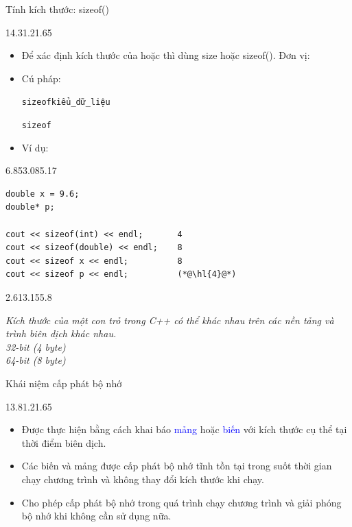 \begin{frame}[fragile]{Tính kích thước: sizeof()}
\begin{blk}{14.3}{1.2}{1.65}
\begin{itemize}[itemsep=3pt]\small
\item Để xác định kích thước của  hoặc  thì dùng size hoặc sizeof(). Đơn vị: 
\item Cú pháp:\par\vspace{2pt}
  \hspace*{5.5cm}\texttt{\textcolor{codekw}{sizeof}\bk{(}\textcolor{codenum}{kiểu\_dữ\_liệu}\bk{)}}\par\vspace{2pt}
  \hspace*{5.5cm}\texttt{\textcolor{codekw}{sizeof} }
\item Ví dụ:
\end{itemize}
\end{blk}
\begin{blk}{6.85}{3.08}{5.17}
\begin{lstlisting}[basicstyle=\cf{10.7}]
double x = 9.6;
double* p;

cout << sizeof(int) << endl;       4
cout << sizeof(double) << endl;    8
cout << sizeof x << endl;          8
cout << sizeof p << endl;          (*@\hl{4}@*)
\end{lstlisting}
\end{blk}
\begin{blk}{2.6}{13.15}{5.8}
\raggedright\fontsize{5.5}{6.6}\selectfont\itshape
Kích thước của một con trỏ trong C++ có thể khác nhau trên các nền tảng và trình biên dịch khác nhau.\\
32-bit (4 byte)\\
64-bit (8 byte)
\end{blk}
\end{frame}

\begin{frame}{Khái niệm cấp phát bộ nhớ}
\begin{blk}{13.8}{1.2}{1.65}
\begin{itemize}[itemsep=3pt]\small
\item Được thực hiện bằng cách khai báo \textcolor{blue}{mảng} hoặc \textcolor{blue}{biến} với kích thước cụ thể tại thời điểm biên dịch.
\item Các biến và mảng được cấp phát bộ nhớ tĩnh tồn tại trong suốt thời gian chạy chương trình và không thay đổi kích thước khi chạy.
\end{itemize}
\vspace{0.7cm}
\begin{itemize}[itemsep=3pt]\small
\item Cho phép cấp phát bộ nhớ trong quá trình chạy chương trình và giải phóng bộ nhớ khi không cần sử dụng nữa.
\end{itemize}
\end{blk}
\end{frame}

